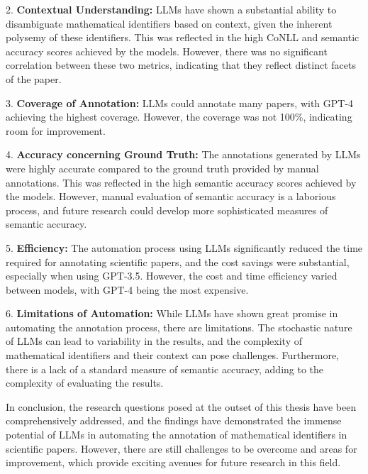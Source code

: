 2. \textbf{Contextual Understanding:} LLMs have shown a substantial ability to disambiguate mathematical identifiers based on context, given the inherent polysemy of these identifiers. This was reflected in the high CoNLL and semantic accuracy scores achieved by the models. However, there was no significant correlation between these two metrics, indicating that they reflect distinct facets of the paper.

3. \textbf{Coverage of Annotation:} LLMs could annotate many papers, with GPT-4 achieving the highest coverage. However, the coverage was not 100\%, indicating room for improvement.

4. \textbf{Accuracy concerning Ground Truth:} The annotations generated by LLMs were highly accurate compared to the ground truth provided by manual annotations. This was reflected in the high semantic accuracy scores achieved by the models. However, manual evaluation of semantic accuracy is a laborious process, and future research could develop more sophisticated measures of semantic accuracy.

5. \textbf{Efficiency:} The automation process using LLMs significantly reduced the time required for annotating scientific papers, and the cost savings were substantial, especially when using GPT-3.5. However, the cost and time efficiency varied between models, with GPT-4 being the most expensive.

6. \textbf{Limitations of Automation:} While LLMs have shown great promise in automating the annotation process, there are limitations. The stochastic nature of LLMs can lead to variability in the results, and the complexity of mathematical identifiers and their context can pose challenges. Furthermore, there is a lack of a standard measure of semantic accuracy, adding to the complexity of evaluating the results.

In conclusion, the research questions posed at the outset of this thesis have been comprehensively addressed, and the findings have demonstrated the immense potential of LLMs in automating the annotation of mathematical identifiers in scientific papers. However, there are still challenges to be overcome and areas for improvement, which provide exciting avenues for future research in this field.
